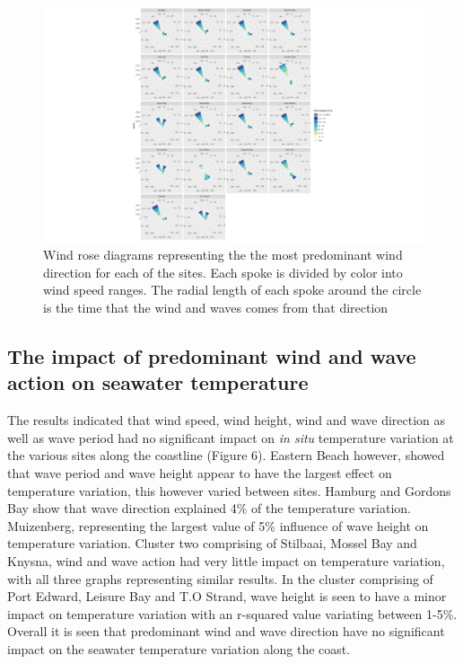 \documentclass[12pt,A4paper,]{article}
\begin{document}
\begin{figure}
\centering
\includegraphics{../figures/p.wr3.pdf}
\caption{Wind rose diagrams representing the the most predominant wind
direction for each of the sites. Each spoke is divided by color into
wind speed ranges. The radial length of each spoke around the circle is
the time that the wind and waves comes from that direction}
\end{figure}

\subsection{The impact of predominant wind and wave action on seawater
temperature}\label{the-impact-of-predominant-wind-and-wave-action-on-seawater-temperature}

The results indicated that wind speed, wind height, wind and wave
direction as well as wave period had no significant impact on \emph{in
situ} temperature variation at the various sites along the coastline
(Figure 6). Eastern Beach however, showed that wave period and wave
height appear to have the largest effect on temperature variation, this
however varied between sites. Hamburg and Gordons Bay show that wave
direction explained 4\% of the temperature variation. Muizenberg,
representing the largest value of 5\% influence of wave height on
temperature variation. Cluster two comprising of Stilbaai, Mossel Bay
and Knysna, wind and wave action had very little impact on temperature
variation, with all three graphs representing similar results. In the
cluster comprising of Port Edward, Leisure Bay and T.O Strand, wave
height is seen to have a minor impact on temperature variation with an
r-squared value variating between 1-5\%. Overall it is seen that
predominant wind and wave direction have no significant impact on the
seawater temperature variation along the coast.
\end{document}
